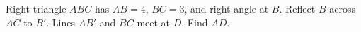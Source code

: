 Right triangle $ ABC $ has $ AB=4 $, $ BC=3 $, and right angle at $ B $. Reflect $ B $ across $ AC $ to $ B'$. Lines $ AB'$ and $ BC $ meet at $ D $. Find $ AD $.
